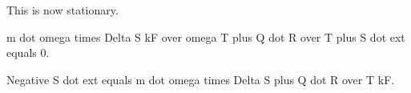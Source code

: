 This is now stationary.

m dot omega times Delta S kF over omega T plus Q dot R over T plus S dot ext equals 0.

Negative S dot ext equals m dot omega times Delta S plus Q dot R over T kF.